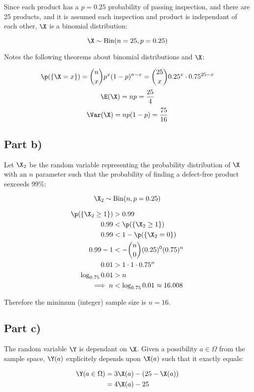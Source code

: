 Since each product has a $p = 0.25$ probability of passing inspection, and there are 25 products, and it is assumed each inspection and product is independant of each other, $\X$ is a binomial distribution:

\[
\X \sim \mathrm{Bin}(n = 25, p = 0.25)
\]

Notes the following theorems about binomial distributions and $\X$:

\[
\p(\{ \X = x \}) = {n \choose x}p^x (1-p)^{n - x} = {25 \choose x}0.25^x \cdot 0.75^{25 - x}
\]
\[
\E(\X) = np = \frac{25}{4}
\]
\[
\Var(\X) = np(1-p) = \frac{75}{16}
\]

\subsection{Part b)}

Let $\X_2$ be the random variable representing the probability distribution of $\X$ with an $n$ parameter
such that the probability of finding a defect-free product eexceeds 99\%:


\[
\X_2 \sim \mathrm{Bin}(n, p = 0.25)
\]

\begin{align*}
\p(\{\X_2 \geq 1\}) &> 0.99 \\
0.99 &< \p(\{ \X_2 \geq 1 \}) \\
0.99 &< 1 - \p(\{ \X_2 = 0 \}) \\
0.99 - 1 &< - {n \choose 0}(0.25)^0(0.75)^n \\
0.01 &> 1 \cdot 1 \cdot 0.75^n \\
\log _{0.75} 0.01 &> n \\
\implies n &< \log _{0.75} 0.01 \approx 16.008
\end{align*}

Therefore the minimum (integer) sample size is $n = 16$.

\subsection{Part c)}

The random variable $\Y$ is dependant on $\X$.
Given a possibility $a \in \Omega$ from the sample space, $\Y(a)$ explicitely depends upon $\X(a)$ such that it exactly equals:

\begin{align*}
\Y(a \in \Omega) &= 3\X(a) - (25 - \X(a)) \\
&= 4\X(a) - 25
\end{align*}

